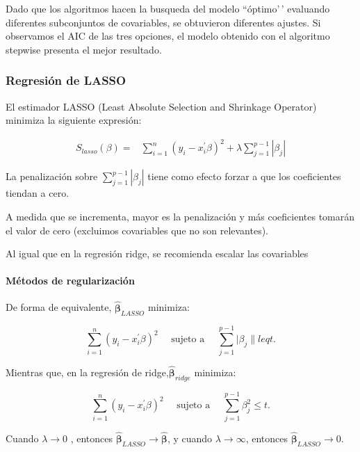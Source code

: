 \documentclass[
]{article}
\begin{document}
Dado que los algoritmos hacen la busqueda del modelo ``óptimo'\,' evaluando diferentes subconjuntos de covariables, se obtuvieron diferentes ajustes. Si observamos el AIC de las tres opciones, el modelo obtenido con el algoritmo stepwise presenta el mejor resultado.

\hypertarget{regresiuxf3n-de-lasso}{%
\subsubsection{Regresión de LASSO}\label{regresiuxf3n-de-lasso}}

El estimador LASSO (Least Absolute Selection and Shrinkage
Operator) minimiza la siguiente expresión:

\begin{equation}
\begin{split}
S_{lasso}(\beta)=& \sum_{i=1}^{n}(y_{i}-x_{i}^{′}\beta)^{2}+
\lambda\sum_{j=1}^{p-1}|\beta_{j}|                            
\end{split}
\nonumber
\end{equation}

La penalización sobre \(\sum_{j=1}^{p-1}|\beta_{j}|\) tiene como efecto forzar a que los
coeficientes tiendan a cero.

A medida que \lambda se incrementa, mayor es la penalización y más
coeficientes tomarán el valor de cero (excluimos covariables que no
son relevantes).

Al igual que en la regresión ridge, se recomienda escalar las
covariables

\hypertarget{muxe9todos-de-regularizaciuxf3n}{%
\paragraph{Métodos de regularización}\label{muxe9todos-de-regularizaciuxf3n}}

De forma de equivalente, \(\widehat{\boldsymbol \beta}_{LASSO}\) minimiza:

\[
\sum_{i=1}^{n}(y_{i}-x_{i}^{′}\beta)^{2} \quad \mbox{ sujeto a } \quad
\sum_{j=1}^{p-1}|\beta_{j}\|leq t.
\]

Mientras que, en la regresión de ridge,\(\widehat{\boldsymbol \beta}_{ridge}\) minimiza:

\[
\sum_{i=1}^{n}(y_{i}-x_{i}^{′}\beta)^{2} \quad \mbox{ sujeto a } \quad
\sum_{j=1}^{p-1}\beta_{j}^2\leq t.
\]

Cuando \(\lambda \rightarrow 0\) , entonces \(\widehat{\boldsymbol \beta}_{LASSO} \rightarrow \widehat{\boldsymbol \beta}\), y cuando
\(\lambda \rightarrow \infty\), entonces \(\widehat{\boldsymbol \beta}_{LASSO} \rightarrow 0\).
\end{document}
